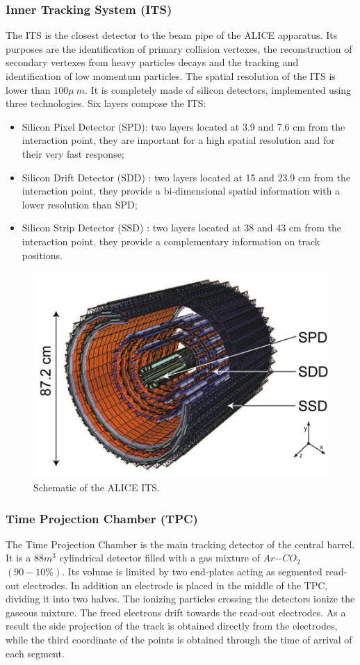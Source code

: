 \subsubsection{Inner Tracking System (ITS)}
The ITS is the closest detector to the beam pipe of the ALICE apparatus.
Its purposes are the identification of primary collision vertexes, the reconstruction of secondary vertexes from heavy particles decays and the tracking and identification of low momentum particles.
The spatial resolution of the ITS is lower than $100\mu~m$.
It is completely made of silicon detectors, implemented using three technologies.
Six layers compose the ITS:
\begin{itemize}
    \item Silicon Pixel Detector (SPD): two layers located at 3.9 and 7.6 cm from the interaction point, they are important for a high spatial resolution and for their very fast response;
    \item Silicon Drift Detector (SDD) : two layers located at 15 and 23.9 cm from the interaction point, they provide a bi-dimensional spatial information with a lower resolution than SPD;
    \item Silicon Strip Detector (SSD) : two layers located at 38 and 43 cm from the interaction point, they provide a complementary information on track positions.
\end{itemize}


\begin{figure}[!h]
\begin{center}
\includegraphics[width=0.7\linewidth]{Chapters/Introduction/Figs/its.png}
\caption{Schematic of the ALICE ITS.}
\label{fig:ITS}
\end{center}
\end{figure}

\subsubsection{Time Projection Chamber (TPC)}
The Time Projection Chamber is the main tracking detector of the central barrel.
It is a $88 m^3$ cylindrical detector filled with a gas mixture of $Ar$−$CO_2$ $(90-10\%)$.
Its volume is limited by two end-plates acting as segmented read-out electrodes. 
In addition an electrode is placed in the middle of the TPC, dividing it into two halves.
The ionizing particles crossing the detectors ionize the gaseous mixture.
The freed electrons drift towards the read-out electrodes.
As a result the side projection of the track is obtained directly from the electrodes, while the third coordinate of the points is obtained through the time of arrival of each segment.

